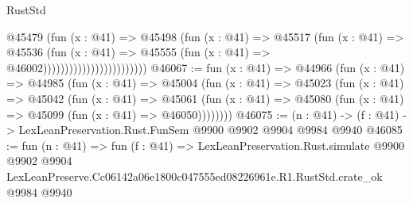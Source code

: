 \begin{lexlean}{RustStd}
\begin{coremodule}
                                        @45479
                                          (fun (x : @41) =>
                                          @45498
                                            (fun (x : @41) =>
                                            @45517
                                              (fun (x : @41) =>
                                              @45536
                                                (fun (x : @41) =>
                                                @45555
                                                  (fun (x : @41) => @46002))))))))))))))))))))))))
@46067 := fun (x : @41) =>
  @44966
    (fun (x : @41) =>
    @44985
      (fun (x : @41) =>
      @45004
        (fun (x : @41) =>
        @45023
          (fun (x : @41) =>
          @45042
            (fun (x : @41) =>
            @45061
              (fun (x : @41) => @45080 (fun (x : @41) => @45099 (fun (x : @41) => @46050))))))))
@46075 := (n : @41) -> (f : @41) -> LexLeanPreservation.Rust.FunSem @9900 @9902 @9904 @9984 @9940
@46085 := fun (n : @41) =>
  fun (f : @41) =>
  LexLeanPreservation.Rust.simulate
    @9900
    @9902
    @9904
    LexLeanPreserve.Cc06142a06e1800c047555ed08226961e.R1.RustStd.crate_ok
    @9984
    @9940
\end{coremodule}
\end{lexlean}
